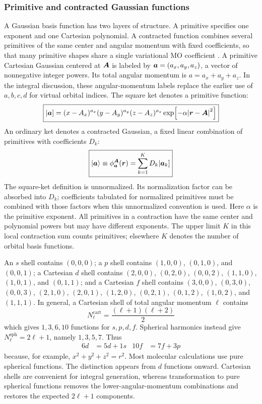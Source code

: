 \hfBioBoys

\hfBioHuzinaga

\subsubsection{Primitive and contracted Gaussian functions}

A Gaussian basis function has two layers of structure. A primitive specifies
one exponent and one Cartesian polynomial. A contracted function combines
several primitives of the same center and angular momentum with fixed
coefficients, so that many primitive shapes share a single variational MO
coefficient \citep{Raffenetti1973}.
A primitive Cartesian Gaussian centered at $\boldsymbol{A}$ is labeled by
$\boldsymbol{a}=(a_x,a_y,a_z)$, a vector of nonnegative integer powers. Its total angular
momentum is $a=a_x+a_y+a_z$. In the integral discussion, these angular-momentum
labels replace the earlier use of $a,b,c,d$ for virtual orbital indices.
The square ket denotes a primitive function:
\begin{equation}
  \boxed{
  \lvert\boldsymbol{a}]=(x-A_x)^{a_x}(y-A_y)^{a_y}(z-A_z)^{a_z}
  \exp[-\alpha\abs{\boldsymbol{r}-\boldsymbol{A}}^2]
  }
\end{equation}
An ordinary ket denotes a contracted Gaussian, a fixed linear combination
of primitives with coefficients $D_k$:
\begin{equation}
  \boxed{
  \ket{\boldsymbol{a}}\equiv\phi_{\boldsymbol{a}}^{\boldsymbol{A}}(\boldsymbol{r})
  =\sum_{k=1}^{K}D_k\lvert\boldsymbol{a}_k]
  }
\end{equation}
The square-ket definition is unnormalized. Its normalization factor can be
absorbed into $D_k$; coefficients tabulated for normalized primitives must
be combined with those factors when this unnormalized convention is used.
Here $\alpha$ is the primitive exponent. All primitives in a contraction have
the same center and polynomial powers but may have different exponents.
The upper limit $K$ in this local contraction sum counts primitives;
elsewhere $K$ denotes the number of orbital basis functions.

An $s$ shell contains $(0,0,0)$; a $p$ shell contains $(1,0,0)$,
$(0,1,0)$, and $(0,0,1)$; a Cartesian $d$ shell contains
$(2,0,0)$, $(0,2,0)$, $(0,0,2)$, $(1,1,0)$, $(1,0,1)$, and $(0,1,1)$;
and a Cartesian $f$ shell contains $(3,0,0)$, $(0,3,0)$, $(0,0,3)$, $(2,1,0)$, $(2,0,1)$,
$(1,2,0)$, $(0,2,1)$, $(0,1,2)$, $(1,0,2)$, and $(1,1,1)$.
In general, a Cartesian shell of total angular momentum $\ell$ contains
\begin{equation}
  N_\ell^\text{cart}=\frac{(\ell+1)(\ell+2)}{2}
\end{equation}
which gives $1,3,6,10$ functions for $s,p,d,f$. Spherical harmonics instead
give $N_\ell^\text{sph}=2\ell+1$, namely $1,3,5,7$. Thus
\begin{align}
  6d&=5d+1s
  &
  10f&=7f+3p
\end{align}
because, for example, $x^2+y^2+z^2=r^2$. Most molecular calculations use
pure spherical functions.
The distinction appears from $d$ functions onward. Cartesian shells are
convenient for integral generation, whereas transformation to pure spherical
functions removes the lower-angular-momentum combinations and restores the
expected $2\ell+1$ components.


